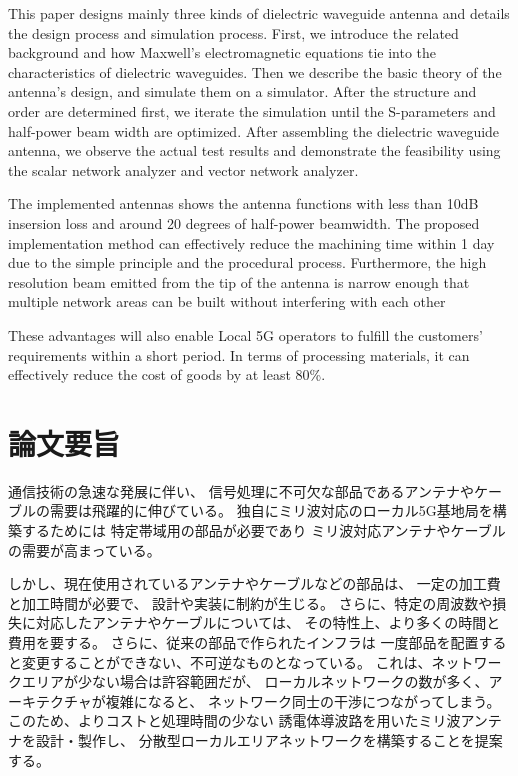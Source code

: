 \documentclass[a4paper,12pt]{report}
\begin{document}
This paper designs mainly three kinds of dielectric waveguide antenna
and details the design process and simulation process.
First, we introduce the related background
and how Maxwell's electromagnetic equations tie into the characteristics
of dielectric waveguides.
Then we describe the basic theory of the antenna's design,
and simulate them on a simulator.
After the structure and order are determined first,
we iterate the simulation until
the S-parameters and half-power beam width are optimized.
After
assembling the dielectric waveguide antenna,
we observe the actual
test results and demonstrate the feasibility
using the scalar network analyzer and vector network analyzer.

The implemented antennas shows the antenna functions with less than 10dB
insersion loss and around 20 degrees of half-power beamwidth.
The proposed implementation
method can effectively reduce the machining time within 1 day
due to the simple principle and the procedural process.
Furthermore, the high resolution beam
emitted from the tip of the antenna is narrow enough
that multiple network areas can be built without interfering with each other

These advantages will also enable Local 5G operators
to fulfill the customers' requirements within a short period. In terms of
processing materials,
it can effectively reduce the cost of goods by at least
80\%.

\chapter*{\centering 論文要旨}

通信技術の急速な発展に伴い、
信号処理に不可欠な部品であるアンテナやケーブルの需要は飛躍的に伸びている。
独自にミリ波対応のローカル5G基地局を構築するためには
特定帯域用の部品が必要であり
ミリ波対応アンテナやケーブルの需要が高まっている。

しかし、現在使用されているアンテナやケーブルなどの部品は、
一定の加工費と加工時間が必要で、
設計や実装に制約が生じる。
さらに、特定の周波数や損失に対応したアンテナやケーブルについては、
その特性上、より多くの時間と費用を要する。
さらに、従来の部品で作られたインフラは
一度部品を配置すると変更することができない、不可逆なものとなっている。
これは、ネットワークエリアが少ない場合は許容範囲だが、
ローカルネットワークの数が多く、アーキテクチャが複雑になると、
ネットワーク同士の干渉につながってしまう。
このため、よりコストと処理時間の少ない
誘電体導波路を用いたミリ波アンテナを設計・製作し、
分散型ローカルエリアネットワークを構築することを提案する。
\end{document}
